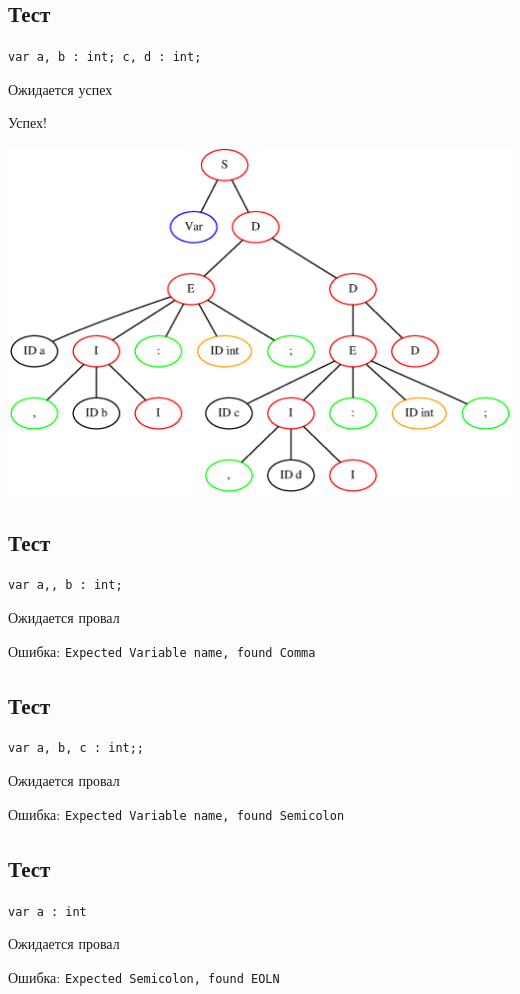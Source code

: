 \subsection{Тест }

\texttt{var a, b : int; c, d : int;}

Ожидается успех

Успех! 

\includegraphics[width=\textwidth]{test6.eps}

\subsection{Тест }

\texttt{var a,, b : int;}

Ожидается провал

Ошибка: \texttt{Expected Variable name, found Comma}

\subsection{Тест }

\texttt{var a, b, c : int;;}

Ожидается провал

Ошибка: \texttt{Expected Variable name, found Semicolon}

\subsection{Тест }

\texttt{var a : int}

Ожидается провал

Ошибка: \texttt{Expected Semicolon, found EOLN}

